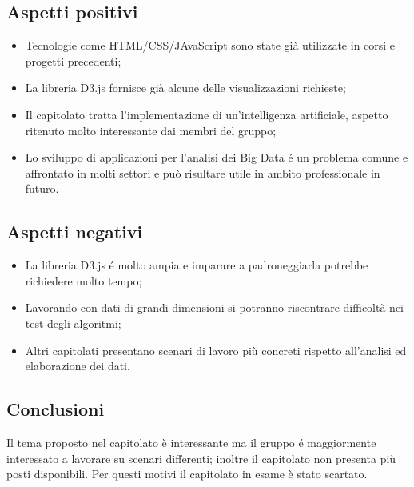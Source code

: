 \subsection{Aspetti positivi}
\begin{itemize}
    \item Tecnologie come HTML/CSS/JAvaScript sono state già utilizzate in corsi e progetti precedenti;
    \item La libreria D3.js fornisce già alcune delle visualizzazioni richieste;
    \item Il capitolato tratta l'implementazione di un'intelligenza artificiale, aspetto ritenuto molto interessante dai membri del gruppo;
    \item Lo sviluppo di applicazioni per l'analisi dei Big Data é un problema comune e affrontato in molti settori e può risultare utile in ambito professionale in futuro.
\end{itemize}

\subsection{Aspetti negativi}
\begin{itemize}
    \item La libreria D3.js é molto ampia e imparare a padroneggiarla potrebbe richiedere molto tempo;
    \item Lavorando con dati di grandi dimensioni si potranno riscontrare difficoltà nei test degli algoritmi;
    \item Altri capitolati presentano scenari di lavoro più concreti rispetto all'analisi ed elaborazione dei dati.
\end{itemize}


\subsection{Conclusioni}
Il tema proposto nel capitolato è interessante ma il gruppo é maggiormente interessato a lavorare su scenari differenti;
inoltre il capitolato non presenta più posti disponibili. Per questi motivi il capitolato in esame è stato scartato.